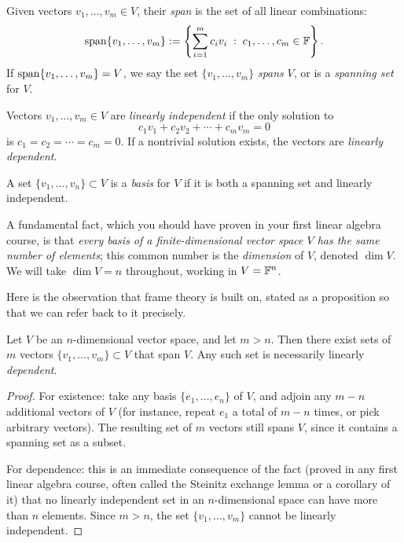 \begin{definition}[Span]
\label{def:span}
Given vectors $v_1, \dots, v_m \in V$, their \emph{span} is the set of all linear combinations:
$$
\operatorname{span}\{v_1, \dots, v_m\} := \left\{ \sum_{i=1}^m c_i v_i \;:\; c_1, \dots, c_m \in \mathbb{F} \right\}.
$$
If $\operatorname{span}\{v_1, \dots, v_m\} = V$, we say the set $\{v_1, \dots, v_m\}$ \emph{spans} $V$, or is a \emph{spanning set} for $V$.
\end{definition}

\begin{definition}
\label{def:linear-independence}
Vectors $v_1, \dots, v_m \in V$ are \emph{linearly independent} if the only solution to
$$
c_1 v_1 + c_2 v_2 + \cdots + c_m v_m = 0
$$
is $c_1 = c_2 = \cdots = c_m = 0$. If a nontrivial solution exists, the vectors are \emph{linearly dependent}.
\end{definition}

\begin{definition}[Basis]
\label{def:basis}
A set $\{v_1, \dots, v_n\} \subset V$ is a \emph{basis} for $V$ if it is both a spanning set and linearly independent.
\end{definition}

A fundamental fact, which you should have proven in your first linear algebra course, is that \emph{every basis of a finite-dimensional vector space $V$ has the same number of elements}; this common number is the \emph{dimension} of $V$, denoted $\dim V$. We will take $\dim V = n$ throughout, working in $V = \mathbb{F}^n$.

Here is the observation that frame theory is built on, stated as a proposition so that we can refer back to it precisely.

\begin{proposition}
\label{prop:redundant-spanning}
Let $V$ be an $n$-dimensional vector space, and let $m > n$. Then there exist sets of $m$ vectors $\{v_1, \dots, v_m\} \subset V$ that span $V$. Any such set is necessarily linearly \emph{dependent}.
\end{proposition}

\begin{proof}
For existence: take any basis $\{e_1, \dots, e_n\}$ of $V$, and adjoin any $m - n$ additional vectors of $V$ (for instance, repeat $e_1$ a total of $m-n$ times, or pick arbitrary vectors). The resulting set of $m$ vectors still spans $V$, since it contains a spanning set as a subset.

For dependence: this is an immediate consequence of the fact (proved in any first linear algebra course, often called the Steinitz exchange lemma or a corollary of it) that no linearly independent set in an $n$-dimensional space can have more than $n$ elements. Since $m > n$, the set $\{v_1, \dots, v_m\}$ cannot be linearly independent.
\end{proof}

